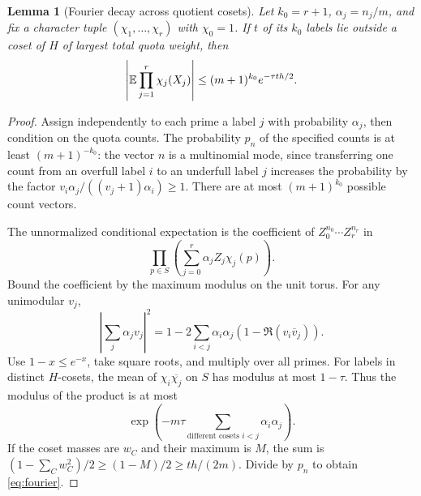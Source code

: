 \documentclass[11pt]{article}
\newtheorem{lemma}[theorem]{Lemma}
\theoremstyle{remark}\newtheorem{remark}[theorem]{Remark}
\begin{document}
\begin{lemma}[Fourier decay across quotient cosets]\label{lem:fourier}
Let $k_0=r+1$, $\alpha_j=n_j/m$, and fix a character tuple $(\chi_1,\ldots,\chi_r)$ with $\chi_0=1$. If $t$ of its $k_0$ labels lie outside a coset of $H$ of largest total quota weight, then
\begin{equation}\label{eq:fourier}
 \left|\mathbb E\prod_{j=1}^r\chi_j(X_j)\right|\le(m+1)^{k_0}e^{-\tau th/2}.
\end{equation}
\end{lemma}
\begin{proof}
Assign independently to each prime a label $j$ with probability $\alpha_j$, then condition on the quota counts. The probability $p_n$ of the specified counts is at least $(m+1)^{-k_0}$: the vector $n$ is a multinomial mode, since transferring one count from an overfull label $i$ to an underfull label $j$ increases the probability by the factor $v_i\alpha_j/((v_j+1)\alpha_i)\ge1$. There are at most $(m+1)^{k_0}$ possible count vectors.

The unnormalized conditional expectation is the coefficient of $Z_0^{n_0}\cdots Z_r^{n_r}$ in
\[
 \prod_{p\in S}\left(\sum_{j=0}^r\alpha_j Z_j\chi_j(p)\right).
\]
Bound the coefficient by the maximum modulus on the unit torus. For any unimodular $v_j$,
\[
 \left|\sum_j\alpha_j v_j\right|^2
 =1-2\sum_{i<j}\alpha_i\alpha_j(1-\Re(v_i\overline v_j)).
\]
Use $1-x\le e^{-x}$, take square roots, and multiply over all primes. For labels in distinct $H$-cosets, the mean of $\chi_i\overline{\chi_j}$ on $S$ has modulus at most $1-\tau$. Thus the modulus of the product is at most
\[
 \exp\left(-m\tau\sum_{\text{different cosets }i<j}\alpha_i\alpha_j\right).
\]
If the coset masses are $w_C$ and their maximum is $M$, the sum is $(1-\sum_C w_C^2)/2\ge(1-M)/2\ge th/(2m)$. Divide by $p_n$ to obtain \eqref{eq:fourier}.
\end{proof}
\end{document}
